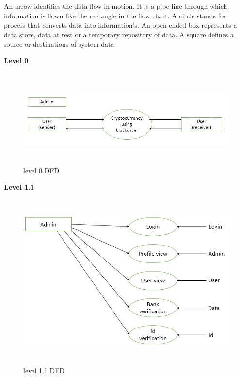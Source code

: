 \documentclass[12pt]{article}
\begin{document}
\newpage

\par An arrow identifies the data flow in motion. It is a pipe line through which
information is flown like the rectangle in the flow chart. A circle stands for process that
converts data into information's. An open-ended box represents a data store, data at rest
or a temporary repository of data. A square defines a source or destinations of system
data.

\begin{flushleft}\textbf{Level 0}\end{flushleft}


\begin{figure}[h!]
\begin{center}
\includegraphics[width=17cm, height=5cm]{DFD1.0}
\caption{level 0 DFD}
\end{center}
\end{figure}
\newpage

\begin{flushleft}\textbf{Level 1.1}\end{flushleft}


\begin{figure}[h!]
\begin{center}
\includegraphics[width=16cm, height=9cm]{DFD1.1}
\caption{ level 1.1 DFD}
\end{center}
\end{figure}
\newpage
\end{document}
